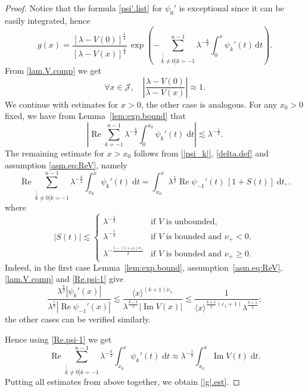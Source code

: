 \begin{proof}
Notice that the formula \eqref{psi'.list} for $\psi_0'$ is exceptional since it can be easily integrated, hence
\begin{equation}\label{g.formula}
g(x) = \frac{[\lambda-V(0)]^\frac 14}{[\lambda-V(x)]^\frac 14} \,
\exp \left( 
- \sum_{\stackrel[k \neq 0]{}{k = -1}}^{n-1} 
\lambda^{-\frac k2} \int_0^x \psi_k'(t) \, {\mathrm{d}} t 
\right).
\end{equation}
From \eqref{lam.V.comp} we get
\begin{equation}
\forall x \in {\mathcal J}, \quad \left|\frac{\lambda-V(0)}{\lambda-V(x)}\right| \approx 1.
\end{equation}
We continue with estimates for $x>0$, the other case is analogous. For any $x_0>0$ fixed, we have from Lemma~\ref{lem:exp.bound} that
\begin{equation}
\left|{\operatorname{Re}} \sum_{k=-1}^{n-1} \lambda^{-\frac k2} \int_0^{x_0} \psi_k'(t) \; {\mathrm{d}} t\right| {\lesssim} \lambda^{-\frac 12}.
\end{equation}
The remaining estimate for $x>x_0$ follows from \eqref{|psi_k|}, \eqref{delta.def} and assumption \eqref{asm.eq:ReV}, namely
\begin{equation}
{\operatorname{Re}} \sum_{\stackrel[k \neq 0]{}{k = -1}}^{n-1} \lambda^{-\frac k2} \int_{x_0}^x \psi_k'(t) \; {\mathrm{d}} t 
= \int_{x_0}^{x} \lambda^{\frac 12} {\operatorname{Re}} \psi_{-1}'(t) \, [1 + S(t)] \; {\mathrm{d}} t,.
\end{equation}
where
\begin{equation}
|S(t)| {\lesssim} 
\begin{cases}
\lambda^{-\frac 12}& \text{if } V \text{ is unbounded},
\\
\lambda^{-\frac 12}& \text{if } V \text{ is bounded and } \nu_+ < 0,
\\[1mm]
\lambda^{-\frac{1-(1+{\varepsilon}_2) \nu_+ }2}& \text{if } V \text{ is bounded and } \nu_+ \geq 0.
\end{cases} 
\end{equation}
Indeed, in the first case Lemma~\ref{lem:exp.bound}, assumption~\eqref{asm.eq:ReV}, \eqref{lam.V.comp} and \eqref{Re.psi-1}  give
\begin{equation}
\frac{\lambda^\frac k2|\psi_k'(x)|}{\lambda^\frac12 |{\operatorname{Re}} \psi_{-1}'(x)|} 
{\lesssim} 
\frac{\langle x \rangle^{(k+1)\nu_\pm}}{\lambda^{\frac {k-1}2 } |{\operatorname{Im}} V(x)|} 
{\lesssim}
\frac{1}{\langle x \rangle^{\frac{k+1}2({\varepsilon}_1+1)} \lambda^{\frac {k+1}4 }};
\end{equation}
the other cases can be verified similarly.

Hence using \eqref{Re.psi-1} we get 
\begin{equation}
{\operatorname{Re}} \sum_{\stackrel[k \neq 0]{}{k = -1}}^{n-1} 
\lambda^{-\frac k2} \int_{x_0}^x \psi_k'(t) \; {\mathrm{d}} t 
\approx 
\lambda^{-\frac 12} \int_{x_0}^{x}  {\operatorname{Im}} V(t) \; {\mathrm{d}} t.
\end{equation}
Putting all estimates from above together, we obtain \eqref{|g|.est}.
\end{proof}

